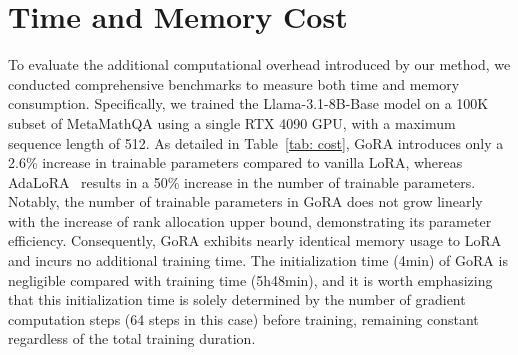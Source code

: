 

\section{Time and Memory Cost}

\begin{table}[ht!]
\centering
\caption{Time and memory cost comparison between GoRA and baseline methods. We report the number of trainable parameters(\#Params), Memory cost recorded by DeepSpeed(Memory), training time(Time@train) and initialization time(Time@init).}
\label{tab: cost}
\small
{}
\end{table}

To evaluate the additional computational overhead introduced by our method, we conducted comprehensive benchmarks to measure both time and memory consumption. Specifically, we trained the Llama-3.1-8B-Base model on a 100K subset of MetaMathQA using a single RTX 4090 GPU, with a maximum sequence length of 512. As detailed in Table~\ref{tab: cost}, GoRA introduces only a 2.6\% increase in trainable parameters compared to vanilla LoRA, whereas AdaLoRA~\citep{zhang2023adalora} results in a 50\% increase in the number of trainable parameters. Notably, the number of trainable parameters in GoRA does not grow linearly with the increase of rank allocation upper bound, demonstrating its parameter efficiency. Consequently, GoRA exhibits nearly identical memory usage to LoRA and incurs no additional training time. The initialization time (4min) of GoRA is negligible compared with training time (5h48min), and it is worth emphasizing that this initialization time is solely determined by the number of gradient computation steps (64 steps in this case) before training, remaining constant regardless of the total training duration.



